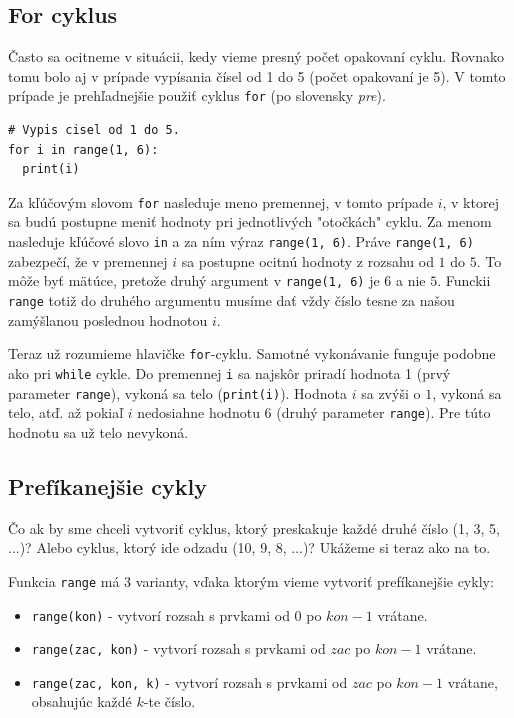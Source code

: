 \documentclass{article}
\begin{document}
\subsection{For cyklus}
Často sa ocitneme v situácii, kedy vieme presný počet opakovaní cyklu. Rovnako tomu bolo aj v prípade vypísania čísel od 1 do 5 (počet opakovaní je 5). V tomto prípade je prehľadnejšie použiť cyklus \texttt{for} (po slovensky \textit{pre}).
\begin{lstlisting}
# Vypis cisel od 1 do 5.
for i in range(1, 6):
  print(i)
\end{lstlisting}
Za kľúčovým slovom \texttt{for} nasleduje meno premennej, v tomto prípade $i$, v ktorej sa budú postupne meniť hodnoty pri jednotlivých "otočkách" cyklu. Za menom nasleduje kľúčové slovo \texttt{in} a za ním výraz \texttt{range(1, 6)}. Práve \texttt{range(1, 6)} zabezpečí, že v premennej $i$ sa postupne ocitnú hodnoty z rozsahu od $1$ do $5$. To môže byť mätúce, pretože druhý argument v \texttt{range(1, 6)} je $6$ a nie $5$. Funckii \texttt{range} totiž do druhého argumentu musíme dať vždy číslo tesne za našou zamýšlanou poslednou hodnotou $i$.

Teraz už rozumieme hlavičke \texttt{for}-cyklu. Samotné vykonávanie funguje podobne ako pri \texttt{while} cykle. Do premennej \texttt{i} sa najskôr priradí hodnota 1 (prvý parameter \texttt{range}), vykoná sa telo (\texttt{print(i)}). Hodnota $i$ sa zvýši o $1$, vykoná sa telo, atď. až pokiaľ $i$ nedosiahne hodnotu 6 (druhý parameter \texttt{range}). Pre túto hodnotu sa už telo nevykoná.

\subsection{Prefíkanejšie cykly}
Čo ak by sme chceli vytvoriť cyklus, ktorý preskakuje každé druhé číslo (1, 3, 5, ...)? Alebo cyklus, ktorý ide odzadu (10, 9, 8, ...)? Ukážeme si teraz ako na to.

Funkcia \texttt{range} má 3 varianty, vďaka ktorým vieme vytvoriť prefíkanejšie cykly:
\begin{itemize}
  \item \texttt{range(kon)} - vytvorí rozsah s prvkami od $0$ po $kon - 1$ vrátane.
  \item \texttt{range(zac, kon)} - vytvorí rozsah s prvkami od $zac$ po $kon - 1$ vrátane.
  \item \texttt{range(zac, kon, k)} - vytvorí rozsah s prvkami od $zac$ po $kon - 1$ vrátane,
  obsahujúc každé $k$-te číslo.
\end{itemize} 
\end{document}
